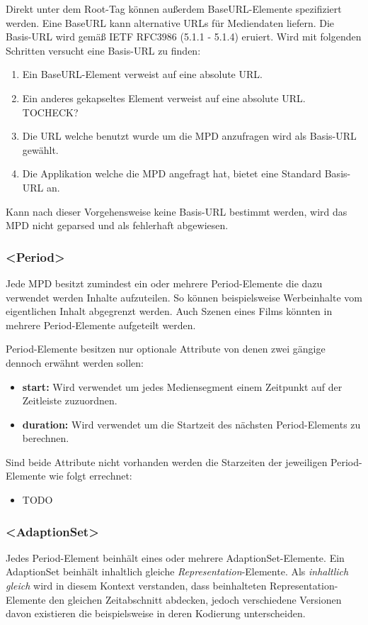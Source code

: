 \documentclass[paper = a4, fontsize = 12pt, parskip = half]{scrartcl} %
\begin{document}
Direkt unter dem Root-Tag können außerdem BaseURL-Elemente spezifiziert werden. Eine BaseURL kann alternative URLs für Mediendaten liefern.
Die Basis-URL wird gemäß IETF RFC3986 (5.1.1 - 5.1.4) eruiert. Wird mit folgenden Schritten versucht eine Basis-URL zu finden:

\begin{enumerate}
	\item Ein BaseURL-Element verweist auf eine absolute URL.
	\item Ein anderes gekapseltes Element verweist auf eine absolute URL. TOCHECK?
	\item Die URL welche benutzt wurde um die MPD anzufragen wird als Basis-URL gewählt.
	\item Die Applikation welche die MPD angefragt hat, bietet eine Standard Basis-URL an.
\end{enumerate}

Kann nach dieser Vorgehensweise keine Basis-URL bestimmt werden, wird das MPD nicht geparsed und als fehlerhaft abgewiesen.

\subsubsection{<Period>}
Jede MPD besitzt zumindest ein oder mehrere Period-Elemente die dazu verwendet werden Inhalte aufzuteilen. So können beispielsweise Werbeinhalte vom eigentlichen Inhalt abgegrenzt werden. Auch Szenen eines Films könnten in mehrere Period-Elemente aufgeteilt werden.

Period-Elemente besitzen nur optionale Attribute von denen zwei gängige dennoch erwähnt werden sollen:
\begin{itemize}
	\item \textbf{start:} Wird verwendet um jedes Mediensegment einem Zeitpunkt auf der Zeitleiste zuzuordnen.
	\item \textbf{duration:} Wird verwendet um die Startzeit des nächsten Period-Elements zu berechnen.
\end{itemize}

Sind beide Attribute nicht vorhanden werden die Starzeiten der jeweiligen Period-Elemente wie folgt errechnet:

\begin{itemize}
	\item TODO
\end{itemize}

\subsubsection{<AdaptionSet>}
Jedes Period-Element beinhält eines oder mehrere AdaptionSet-Elemente. Ein AdaptionSet beinhält inhaltlich gleiche \textit{Representation}-Elemente. Als \textit{inhaltlich gleich} wird in diesem Kontext verstanden, dass beinhalteten Representation-Elemente den gleichen Zeitabschnitt abdecken, jedoch verschiedene Versionen davon existieren die beispielsweise in deren Kodierung unterscheiden.
\end{document}
